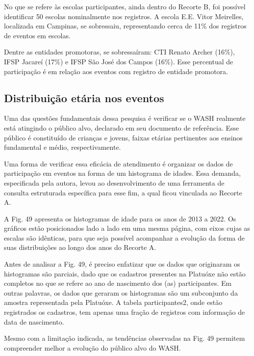 No que se refere às escolas participantes, ainda dentro do Recorte B, foi possível identificar 50 escolas nominalmente nos registros. A escola E.E. Vitor Meirelles,  localizada em Campinas, se sobressaiu, representando cerca de 11\% dos registros de eventos em escolas.

Dentre as entidades promotoras, se sobressaíram: CTI Renato Archer (16\%), IFSP Jacareí (17\%) e IFSP São José dos Campos (16\%). Esse percentual de participação é em relação aos eventos com registro de entidade promotora.

\subsection[Distribuição etária nos eventos]{Distribuição etária nos eventos}\label{Distribuição etária nos eventos}
Uma das questões fundamentais dessa pesquisa é verificar se o WASH realmente está atingindo o público alvo, declarado em seu documento de referência. Esse público é constituído de crianças e jovens, faixas etárias pertinentes aos ensinos fundamental e médio, respectivamente.

Uma forma de verificar essa eficácia de atendimento é organizar os dados de participação em eventos na forma de um histograma de idades. Essa demanda, especificada pela autora, levou ao desenvolvimento de uma ferramenta de consulta estruturada específica para esse fim, a qual ficou vinculada ao Recorte A.

A Fig. 49 apresenta os histogramas de idade para os anos de 2013 a 2022. Os gráficos estão posicionados lado a lado em uma mesma página, com eixos cujas as escalas são idênticas, para que seja possível acompanhar a evolução da forma de suas distribuições ao longo dos anos do Recorte A.

Antes de analisar a Fig. 49, é preciso enfatizar que os dados que originaram os histogramas são parciais, dado que os cadastros presentes na Platuóxe não estão completos no que se refere ao ano de nascimento dos (as) participantes. Em outras palavras, os dados que geraram os histogramas são um subconjunto da amostra representada pela Platuóxe. A tabela participantes2, onde estão registrados os cadastros, tem apenas uma fração de registros com informação de data de nascimento.

Mesmo com a limitação indicada, as tendências observadas na Fig. 49 permitem compreender melhor a evolução do público alvo do WASH.



